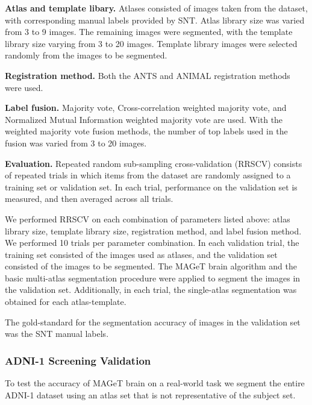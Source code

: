 \documentclass{article}\usepackage{graphicx, color}
\makeatletter
\newenvironment{kframe}{%
 \def\at@end@of@kframe{}%
 \ifinner\ifhmode%
  \def\at@end@of@kframe{\end{minipage}}%
  \begin{minipage}{\columnwidth}%
 \fi\fi%
 \def\FrameCommand##1{\hskip\@totalleftmargin \hskip-\fboxsep
 \colorbox{shadecolor}{##1}\hskip-\fboxsep
     \hskip-\linewidth \hskip-\@totalleftmargin \hskip\columnwidth}%
 \MakeFramed {\advance\hsize-\width
   \@totalleftmargin\z@ \linewidth\hsize
   \@setminipage}}%
 {\par\unskip\endMakeFramed%
 \at@end@of@kframe}
\newcommand{\todo}[1]{\begin{kframe}{\textcolor{red}{TODO #1}}\end{kframe}}
\makeatother
\begin{document}
{\bf Atlas and template libary.}  Atlases consisted of images taken from the 
dataset, with corresponding manual labels provided by SNT.  Atlas library size
was varied from 3 to 9 images.  The remaining images were segmented, with the 
template library size varying from 3 to 20 images.  Template library images were
selected randomly from the images to be segmented. 

{\bf Registration method.}  Both the ANTS and ANIMAL registration methods were 
used.
\todo{In ANIMAL, images aligned to TAL space}

{\bf Label fusion.} Majority vote, Cross-correlation weighted majority vote, and
Normalized Mutual Information weighted majority vote are used.  With the 
weighted majority vote fusion methods, the number of top labels used in the 
fusion was varied from 3 to 20 images.

{\bf Evaluation.}  Repeated random sub-sampling cross-validation (RRSCV) 
consists of repeated trials in which items from the dataset are randomly assigned to a training set or validation set. In each trial, performance on the validation set is measured, and then averaged across all trials. 

We performed RRSCV on each combination of parameters listed above: atlas library size, template library size, registration method, and label fusion method.  We performed 10 trials per parameter combination.  In each validation trial, the training set consisted of the images used as atlases, and the validation set consisted of the images to be segmented. The MAGeT brain algorithm and the basic multi-atlas segmentation procedure were applied to segment the images in the validation set.  Additionally, in each trial, the single-atlas segmentation was obtained for each atlas-template.  

The gold-standard for the segmentation accuracy of images in the validation set was the SNT manual labels.


\todo{ number of registrations/comparisions }


\subsubsection{ADNI-1 Screening Validation}

To test the accuracy of MAGeT brain on a real-world task we segment the entire
ADNI-1 dataset using an atlas set that is not representative of the subject set.
\end{document}
